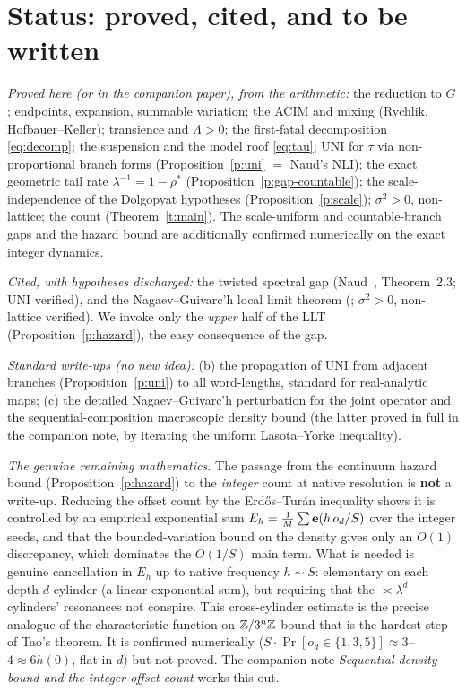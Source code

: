 \documentclass[11pt]{article}
\theoremstyle{definition}\newtheorem{definition}{Definition}
\theoremstyle{remark}\newtheorem{remark}{Remark}
\begin{document}
\section{Status: proved, cited, and to be written}\label{sec:status}
\emph{Proved here (or in the companion paper), from the arithmetic:} the
reduction to $G$; endpoints, expansion, summable variation; the ACIM and mixing
(Rychlik, Hofbauer--Keller); transience and $\Lambda>0$; the first-fatal
decomposition \eqref{eq:decomp}; the suspension and the model roof
\eqref{eq:tau}; UNI for $\tau$ via non-proportional branch forms
(Proposition~\ref{p:uni} $=$ Naud's NLI); the exact geometric tail rate
$\lambda^{-1}=1-\rho^\ast$ (Proposition~\ref{p:gap-countable}); the
scale-independence of the Dolgopyat hypotheses
(Proposition~\ref{p:scale}); $\sigma^2>0$, non-lattice; the count
(Theorem~\ref{t:main}). The scale-uniform and countable-branch gaps and the
hazard bound are additionally confirmed numerically on the exact integer
dynamics.

\emph{Cited, with hypotheses discharged:} the twisted spectral gap
(Naud~\cite{Naud2005}, Theorem~2.3; UNI verified), and the Nagaev--Guivarc'h
local limit theorem (\cite{HennionHerve2001,AaronsonDenker2001}; $\sigma^2>0$,
non-lattice verified). We invoke only the \emph{upper} half of the LLT
(Proposition~\ref{p:hazard}), the easy consequence of the gap.

\emph{Standard write-ups (no new idea):} (b) the propagation of UNI from
adjacent branches (Proposition~\ref{p:uni}) to all word-lengths, standard for
real-analytic maps; (c) the detailed Nagaev--Guivarc'h perturbation for the
joint operator and the sequential-composition macroscopic density bound (the
latter proved in full in the companion note, by iterating the uniform
Lasota--Yorke inequality).

\emph{The genuine remaining mathematics.} The passage from the continuum hazard
bound (Proposition~\ref{p:hazard}) to the \emph{integer} count at native
resolution is \textbf{not} a write-up. Reducing the offset count by the
Erd\H os--Tur\'an inequality shows it is controlled by an empirical exponential
sum $E_h=\frac1M\sum\mathbf e(h\,o_d/S)$ over the integer seeds, and that the
bounded-variation bound on the density gives only an $O(1)$ discrepancy, which
dominates the $O(1/S)$ main term. What is needed is genuine cancellation in
$E_h$ up to native frequency $h\sim S$: elementary on each depth-$d$ cylinder
(a linear exponential sum), but requiring that the $\asymp\lambda^d$ cylinders'
resonances not conspire. This cross-cylinder estimate is the precise analogue of
the characteristic-function-on-$\mathbb{Z}/3^n\mathbb{Z}$ bound that is the hardest step of
Tao's theorem. It is confirmed numerically ($S\cdot\Pr[o_d\in\{1,3,5\}]\approx
3$--$4\approx6h(0)$, flat in $d$) but not proved. The companion note
\emph{Sequential density bound and the integer offset count} works this out.
\end{document}
